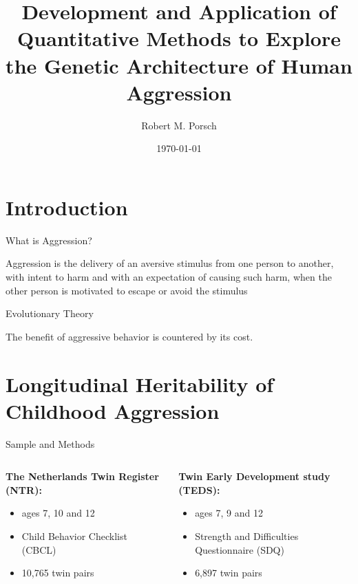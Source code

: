 \documentclass{beamer}
\title{Development and Application of Quantitative Methods to Explore the Genetic Architecture of Human Aggression}
\date{\today}
\author{Robert M. Porsch}
\institute{Department of Psychiatry}
\begin{document}
\maketitle
\tableofcontents

\section{Introduction}
\begin{frame}{What is Aggression?}
  \begin{center}
    \begin{displayquote}
      Aggression is the delivery of an aversive stimulus from one person to another, with intent to harm and with an expectation of causing such harm, when the other person is motivated to escape or avoid the stimulus
    \end{displayquote}
  \end{center}
\end{frame}

\begin{frame}[t]{Evolutionary Theory}
  \begin{center}
    \scalebox{0.7}{}
    The benefit of aggressive behavior is countered by its cost.
  \end{center}
\end{frame}

\section{Longitudinal Heritability of Childhood Aggression}

\begin{frame}[t]{Sample and Methods}
  \begin{columns}
    \begin{column}{0.5\textwidth}
      \textbf{The Netherlands Twin Register (NTR):}\\
      \begin{itemize}
        \item ages 7, 10 and 12
        \item Child Behavior Checklist (CBCL)
        \item 10,765 twin pairs
      \end{itemize}
    \end{column}
    \begin{column}{0.5\textwidth}
      \textbf{Twin Early Development study (TEDS):}\\
      \begin{itemize}
        \item ages 7, 9 and 12
        \item Strength and Difficulties Questionnaire (SDQ)
        \item 6,897 twin pairs
      \end{itemize}
    \end{column}
  \end{columns}
  \begin{center}
    \scalebox{0.7}{}
  \end{center}
\end{frame}
\end{document}
